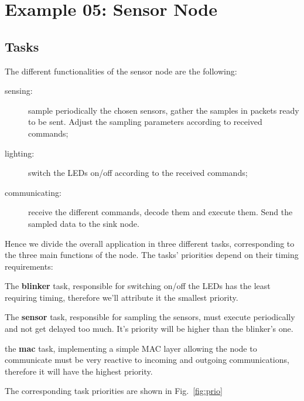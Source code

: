 \documentclass[11pt]{report}
\begin{document}
\section{Example 05: Sensor Node}

\subsection{Tasks}
The different functionalities of the sensor node are the following:
\begin{description}
	\item[sensing:] sample periodically the chosen sensors, gather the samples in packets ready to be sent. Adjust the sampling parameters according to received commands;
	\item[lighting:] switch the LEDs on/off according to the received commands;
	\item[communicating:] receive the different commands, decode them and execute them. Send the sampled data to the sink node.
\end{description}

Hence we divide the overall application in three different tasks, corresponding to the three main functions of the node. The tasks' priorities depend on their timing requirements:

The \textbf{blinker} task, responsible for switching on/off the LEDs has the least requiring timing, therefore we'll attribute it the smallest priority.

The \textbf{sensor} task, responsible for sampling the sensors, must execute periodically and not get delayed too much. It's priority will be higher than the blinker's one.

the \textbf{mac} task, implementing a simple MAC layer allowing the node to communicate must be very reactive to incoming and outgoing communications, therefore it will have the highest priority.

The corresponding task priorities are shown in Fig.~\ref{fig:prio}
\end{document}
